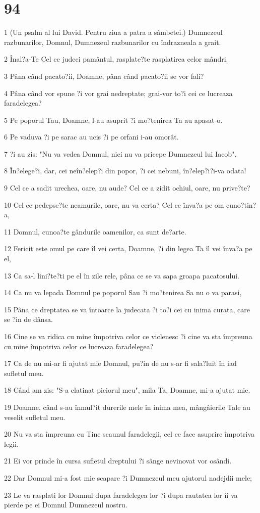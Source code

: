 \chapter{94}

\par 1 (Un psalm al lui David. Pentru ziua a patra a sâmbetei.) Dumnezeul razbunarilor, Domnul, Dumnezeul razbunarilor cu îndrazneala a grait.
\par 2 Înal?a-Te Cel ce judeci pamântul, rasplate?te rasplatirea celor mândri.
\par 3 Pâna când pacato?ii, Doamne, pâna când pacato?ii se vor fali?
\par 4 Pâna când vor spune ?i vor grai nedreptate; grai-vor to?i cei ce lucreaza faradelegea?
\par 5 Pe poporul Tau, Doamne, l-au asuprit ?i mo?tenirea Ta au apasat-o.
\par 6 Pe vaduva ?i pe sarac au ucis ?i pe orfani i-au omorât.
\par 7 ?i au zis: "Nu va vedea Domnul, nici nu va pricepe Dumnezeul lui Iacob".
\par 8 În?elege?i, dar, cei neîn?elep?i din popor, ?i cei nebuni, în?elep?i?i-va odata!
\par 9 Cel ce a sadit urechea, oare, nu aude? Cel ce a zidit ochiul, oare, nu prive?te?
\par 10 Cel ce pedepse?te neamurile, oare, nu va certa? Cel ce înva?a pe om cuno?tin?a,
\par 11 Domnul, cunoa?te gândurile oamenilor, ca sunt de?arte.
\par 12 Fericit este omul pe care îl vei certa, Doamne, ?i din legea Ta îl vei înva?a pe el,
\par 13 Ca sa-l lini?te?ti pe el în zile rele, pâna ce se va sapa groapa pacatosului.
\par 14 Ca nu va lepada Domnul pe poporul Sau ?i mo?tenirea Sa nu o va parasi,
\par 15 Pâna ce dreptatea se va întoarce la judecata ?i to?i cei cu inima curata, care se ?in de dânsa.
\par 16 Cine se va ridica cu mine împotriva celor ce viclenesc ?i cine va sta împreuna cu mine împotriva celor ce lucreaza faradelegea?
\par 17 Ca de nu mi-ar fi ajutat mie Domnul, pu?in de nu s-ar fi sala?luit în iad sufletul meu.
\par 18 Când am zis: "S-a clatinat piciorul meu", mila Ta, Doamne, mi-a ajutat mie.
\par 19 Doamne, când s-au înmul?it durerile mele în inima mea, mângâierile Tale au veselit sufletul meu.
\par 20 Nu va sta împreuna cu Tine scaunul faradelegii, cel ce face asuprire împotriva legii.
\par 21 Ei vor prinde în cursa sufletul dreptului ?i sânge nevinovat vor osândi.
\par 22 Dar Domnul mi-a fost mie scapare ?i Dumnezeul meu ajutorul nadejdii mele;
\par 23 Le va rasplati lor Domnul dupa faradelegea lor ?i dupa rautatea lor îi va pierde pe ei Domnul Dumnezeul nostru.


